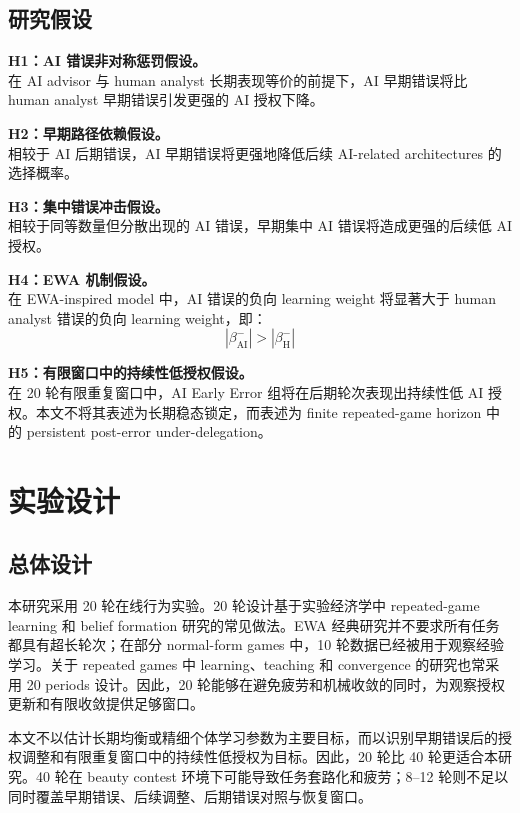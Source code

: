 \documentclass[12pt]{article}
\begin{document}
\subsection{研究假设}

\textbf{H1：AI 错误非对称惩罚假设。}\\
在 AI advisor 与 human analyst 长期表现等价的前提下，AI 早期错误将比 human analyst 早期错误引发更强的 AI 授权下降。

\textbf{H2：早期路径依赖假设。}\\
相较于 AI 后期错误，AI 早期错误将更强地降低后续 AI-related architectures 的选择概率。

\textbf{H3：集中错误冲击假设。}\\
相较于同等数量但分散出现的 AI 错误，早期集中 AI 错误将造成更强的后续低 AI 授权。

\textbf{H4：EWA 机制假设。}\\
在 EWA-inspired model 中，AI 错误的负向 learning weight 将显著大于 human analyst 错误的负向 learning weight，即：
\[
|\beta_{\text{AI}}^{-}| > |\beta_{\text{H}}^{-}|
\]

\textbf{H5：有限窗口中的持续性低授权假设。}\\
在 20 轮有限重复窗口中，AI Early Error 组将在后期轮次表现出持续性低 AI 授权。本文不将其表述为长期稳态锁定，而表述为 finite repeated-game horizon 中的 persistent post-error under-delegation。

\section{实验设计}

\subsection{总体设计}

本研究采用 20 轮在线行为实验。20 轮设计基于实验经济学中 repeated-game learning 和 belief formation 研究的常见做法。EWA 经典研究并不要求所有任务都具有超长轮次；在部分 normal-form games 中，10 轮数据已经被用于观察经验学习。关于 repeated games 中 learning、teaching 和 convergence 的研究也常采用 20 periods 设计。因此，20 轮能够在避免疲劳和机械收敛的同时，为观察授权更新和有限收敛提供足够窗口。

本文不以估计长期均衡或精细个体学习参数为主要目标，而以识别早期错误后的授权调整和有限重复窗口中的持续性低授权为目标。因此，20 轮比 40 轮更适合本研究。40 轮在 beauty contest 环境下可能导致任务套路化和疲劳；8–12 轮则不足以同时覆盖早期错误、后续调整、后期错误对照与恢复窗口。
\end{document}
